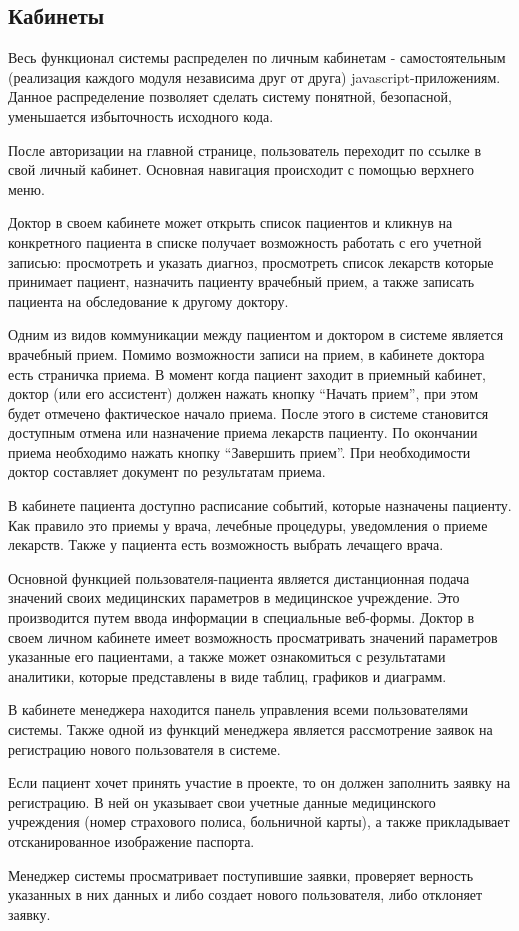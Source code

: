\subsection{Кабинеты}
Весь функционал системы распределен по личным кабинетам - самостоятельным
(реализация каждого модуля независима друг от друга) javascript-приложениям.
Данное распределение позволяет сделать систему понятной, безопасной, уменьшается
избыточность исходного кода.

После авторизации на главной странице, пользователь переходит по ссылке в свой
личный кабинет. Основная навигация происходит с помощью верхнего меню.

Доктор в своем кабинете может открыть список пациентов и кликнув на конкретного
пациента в списке получает возможность работать с его учетной записью:
просмотреть и указать диагноз, просмотреть список лекарств которые принимает
пациент, назначить пациенту врачебный прием, а также записать пациента на
обследование к другому доктору.

Одним из видов коммуникации между пациентом и доктором в системе является
врачебный прием. Помимо возможности записи на прием, в кабинете доктора есть
страничка приема. В момент когда пациент заходит в приемный кабинет, доктор (или
его ассистент) должен нажать кнопку “Начать прием”, при этом будет отмечено
фактическое начало приема. После этого в системе становится доступным отмена или
назначение приема лекарств пациенту. По окончании приема необходимо нажать
кнопку “Завершить прием”. При необходимости доктор составляет документ по
результатам приема.

В кабинете пациента доступно расписание событий, которые назначены пациенту. Как
правило это приемы у врача, лечебные процедуры, уведомления о приеме лекарств.
Также у пациента есть возможность выбрать лечащего врача.

Основной функцией пользователя-пациента является дистанционная подача  значений
своих медицинских параметров в медицинское учреждение. Это производится путем
ввода информации в специальные веб-формы. Доктор в своем личном кабинете имеет
возможность просматривать значений параметров указанные его пациентами, а также
может ознакомиться с результатами аналитики, которые представлены в виде таблиц,
графиков и диаграмм.

В кабинете менеджера находится панель управления всеми пользователями системы.
Также одной из функций менеджера является рассмотрение заявок на регистрацию
нового пользователя в системе.

Если пациент хочет принять участие в проекте, то он должен заполнить заявку на
регистрацию. В ней он указывает свои учетные данные медицинского учреждения
(номер страхового полиса, больничной карты), а также прикладывает
отсканированное изображение паспорта.

Менеджер системы просматривает поступившие заявки, проверяет верность указанных
в них данных и либо создает нового пользователя, либо отклоняет заявку.